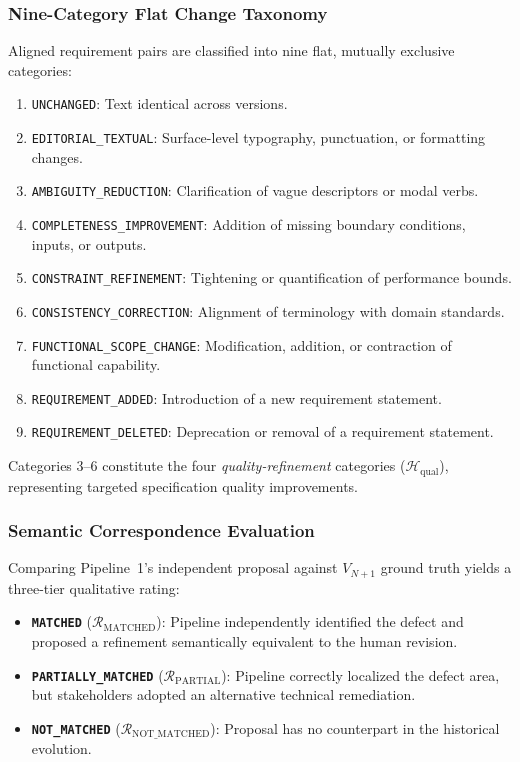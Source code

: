 \documentclass[journal]{IEEEtran}
\begin{document}
\subsubsection{Nine-Category Flat Change Taxonomy}
\label{sec:taxonomy}
Aligned requirement pairs are classified into nine flat, mutually exclusive categories:
\begin{enumerate}
    \item \texttt{UNCHANGED}: Text identical across versions.
    \item \texttt{EDITORIAL\_TEXTUAL}: Surface-level typography, punctuation, or formatting changes.
    \item \texttt{AMBIGUITY\_REDUCTION}: Clarification of vague descriptors or modal verbs.
    \item \texttt{COMPLETENESS\_IMPROVEMENT}: Addition of missing boundary conditions, inputs, or outputs.
    \item \texttt{CONSTRAINT\_REFINEMENT}: Tightening or quantification of performance bounds.
    \item \texttt{CONSISTENCY\_CORRECTION}: Alignment of terminology with domain standards.
    \item \texttt{FUNCTIONAL\_SCOPE\_CHANGE}: Modification, addition, or contraction of functional capability.
    \item \texttt{REQUIREMENT\_ADDED}: Introduction of a new requirement statement.
    \item \texttt{REQUIREMENT\_DELETED}: Deprecation or removal of a requirement statement.
\end{enumerate}
Categories 3--6 constitute the four \emph{quality-refinement} categories ($\mathcal{H}_{\text{qual}}$), representing targeted specification quality improvements.

\subsubsection{Semantic Correspondence Evaluation}
\label{sec:correspondence}
Comparing Pipeline~1's independent proposal against $V_{N+1}$ ground truth yields a three-tier qualitative rating:
\begin{itemize}
    \item \textbf{\texttt{MATCHED}} ($\mathcal{R}_{\text{MATCHED}}$): Pipeline independently identified the defect and proposed a refinement semantically equivalent to the human revision.
    \item \textbf{\texttt{PARTIALLY\_MATCHED}} ($\mathcal{R}_{\text{PARTIAL}}$): Pipeline correctly localized the defect area, but stakeholders adopted an alternative technical remediation.
    \item \textbf{\texttt{NOT\_MATCHED}} ($\mathcal{R}_{\text{NOT\_MATCHED}}$): Proposal has no counterpart in the historical evolution.
\end{itemize}
\end{document}
